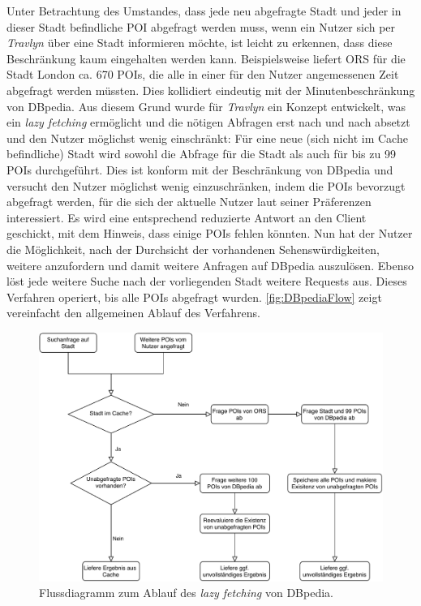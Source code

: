 		Unter Betrachtung des Umstandes, dass jede neu abgefragte Stadt und jeder in dieser Stadt befindliche \acs{POI} abgefragt werden muss, wenn ein Nutzer sich per \textit{Travlyn} über eine Stadt informieren möchte, ist leicht zu erkennen, dass diese Beschränkung kaum eingehalten werden kann. Beispielsweise liefert \acs{ORS} für die Stadt London ca. 670 \acs{POI}s, die alle in einer für den Nutzer angemessenen Zeit abgefragt werden müssten. Dies kollidiert eindeutig mit der Minutenbeschränkung von DBpedia.
		Aus diesem Grund wurde für \textit{Travlyn} ein Konzept entwickelt, was ein \textit{lazy fetching} ermöglicht und die nötigen Abfragen erst nach und nach absetzt und den Nutzer möglichst wenig einschränkt:
		Für eine neue (sich nicht im Cache befindliche) Stadt wird sowohl die Abfrage für die Stadt als auch für bis zu 99 \acs{POI}s durchgeführt. Dies ist konform mit der Beschränkung von DBpedia und versucht den Nutzer möglichst wenig einzuschränken, indem die \acs{POI}s bevorzugt abgefragt werden, für die sich der aktuelle Nutzer laut seiner Präferenzen interessiert. Es wird eine entsprechend reduzierte Antwort an den Client geschickt, mit dem Hinweis, dass einige \acs{POI}s fehlen könnten. Nun hat der Nutzer die Möglichkeit, nach der Durchsicht der vorhandenen Sehenswürdigkeiten, weitere anzufordern und damit weitere Anfragen auf DBpedia auszulösen. Ebenso löst jede weitere Suche nach der vorliegenden Stadt weitere Requests aus. Dieses Verfahren operiert, bis alle \acs{POI}s abgefragt wurden. \autoref{fig:DBpediaFlow} zeigt vereinfacht den allgemeinen Ablauf des Verfahrens.
		
		\begin{figure}[ht!]
			\centering
			\includegraphics[width=1\textwidth]{images/DBpediaFlow.pdf}
			\caption{Flussdiagramm zum Ablauf des \textit{lazy fetching} von DBpedia.}
			\label{fig:DBpediaFlow}
		\end{figure}
	
